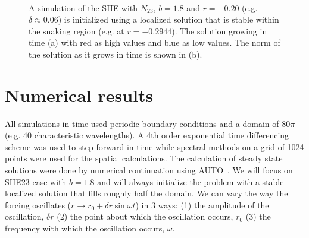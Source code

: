 \documentclass[pre,preprint,superscriptaddress]{revtex4-1}
\begin{document}
\begin{figure}[h]
  \begin{center}
    \mbox{
       \quad
      }
    \caption{A simulation of the SHE with $N_{23}$, $b=1.8$ and $r=-0.20$ (e.g. $\delta\approx 0.06$) is initialized using a localized solution that is stable within the snaking region (e.g. at $r=-0.2944$). The solution growing in time (a) with red as high values and blue as low values.  The norm of the solution as it grows in time is shown in (b).}
    \label{fig:nucleation}
  \end{center}
\end{figure} 

\section{Numerical results}

All simulations in time used periodic boundary conditions and a domain of $80\pi$ (e.g. 40 characteristic wavelengths).  A 4th order exponential time differencing scheme\cite{} was used to step forward  in time while spectral methods on a grid of 1024 points were used for the spatial calculations.  The  calculation of steady state solutions were done by numerical continuation using AUTO~\cite{}.   We will focus on SHE23 case with $b=1.8$ and will always initialize the problem with a stable localized solution that fills roughly half the domain.  We can vary the way the forcing oscillates ($r\rightarrow r_0+\delta r \sin\omega t$) in 3 ways: (1) the amplitude of the oscillation, $\delta r$ (2) the point about which the oscillation occurs, $r_0$ (3) the frequency with which the oscillation occurs, $\omega$.
\end{document}
